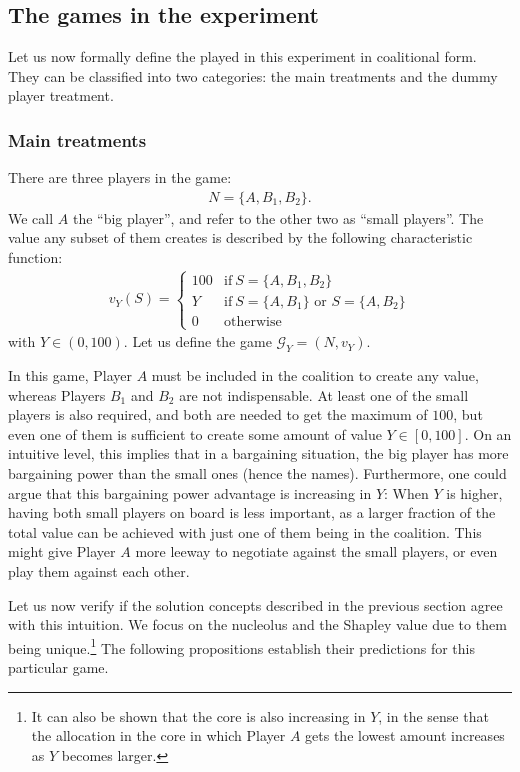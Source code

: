 \subsection{The games in the experiment}

Let us now formally define the played in this experiment in coalitional form. They can be classified into two categories: the main treatments and the dummy player treatment. 

\subsubsection{Main treatments} \label{explanation_main_treatments}

There are three players in the game:
\begin{align*}
    N = \{A, B_1, B_2\}.
\end{align*}
We call $A$ the ``big player'', and refer to the other two as ``small players''. The value any subset of them creates is described by the following characteristic function:
\begin{align*}
    v_Y(S) = \begin{cases}
        100 & \text{if}\ S = \{A, B_1, B_2\} \\
        Y & \text{if}\ S = \{A, B_1\} \text{ or } S = \{A, B_2\} \\
        0 & \text{otherwise}
    \end{cases}
\end{align*}
with $Y \in (0, 100)$. Let us define the game $\mathcal{G}_Y = (N, v_Y)$.

In this game, Player $A$ must be included in the coalition to create any value, whereas Players $B_1$ and $B_2$ are not indispensable. At least one of the small players is also required, and both are needed to get the maximum of $100$, but even one of them is sufficient to create some amount of value $Y \in [0, 100]$. On an intuitive level, this implies that in a bargaining situation, the big player has more bargaining power than the small ones (hence the names). Furthermore, one could argue that this bargaining power advantage is increasing in $Y$: When $Y$ is higher, having both small players on board is less important, as a larger fraction of the total value can be achieved with just one of them being in the coalition. This might give Player $A$ more leeway to negotiate against the small players, or even play them against each other.

Let us now verify if the solution concepts described in the previous section agree with this intuition. We focus on the nucleolus and the Shapley value due to them being unique.\footnote{It can also be shown that the core is also increasing in $Y$, in the sense that the allocation in the core in which Player $A$ gets the lowest amount increases as $Y$ becomes larger.} The following propositions establish their predictions for this particular game.

